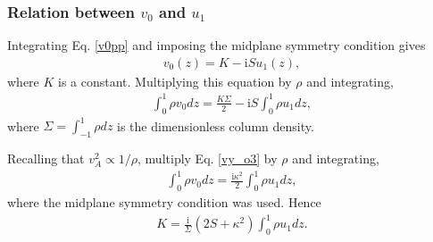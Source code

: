 \documentclass[12pt,preprint]{aastex}
\newcommand{\imgi}{\mathrm{i}}
\begin{document}
\subsubsection{Relation between $v_0$ and $u_1$}
Integrating Eq. \ref{v0pp} and imposing the midplane symmetry
condition gives
\begin{align}
  v_0(z) = K -\imgi S u_1(z),  
\end{align}
where $K$ is a constant. Multiplying this equation by $\rho$ and
integrating, 
\begin{align}
  \int_0^1\rho v_0 dz = \frac{K\Sigma}{2} - \imgi S \int_0^1\rho u_1 dz, 
\end{align}
where $\Sigma = \int_{-1}^1\rho dz$ is the dimensionless column
density. 

Recalling that $v_A^2\propto 1/\rho$, multiply Eq. \ref{vy_o3} by
$\rho$ and integrating,
\begin{align}
  \int_0^1\rho v_0 dz = \frac{\imgi\kappa^2}{2} \int_0^1\rho u_1 dz, 
\end{align} 
where the midplane symmetry condition was used. Hence
\begin{align}
  K = \frac{\imgi}{\Sigma}\left(2S + \kappa^2\right)\int_0^1\rho u_1
  dz. \label{K_def}
\end{align}
\end{document}
